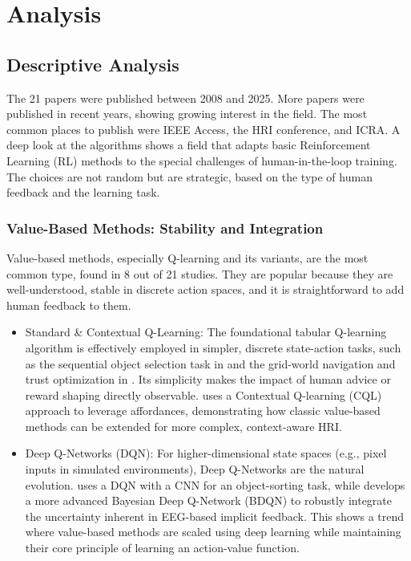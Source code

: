 \documentclass[rnd]{mas_proposal}
\begin{document}
\section{Analysis}
\label{sec:analysis}

\subsection{Descriptive Analysis}
The 21 papers were published between 2008 and 2025. More papers were published in recent years, showing growing interest in the field. The most common places to publish were IEEE Access, the HRI conference, and ICRA.
A deep look at the algorithms shows a field that adapts basic Reinforcement Learning (RL) methods to the special challenges of human-in-the-loop training. The choices are not random but are strategic, based on the type of human feedback and the learning task.


\subsubsection{Value-Based Methods: Stability and Integration}
Value-based methods, especially Q-learning and its variants, are the most common type, found in 8 out of 21 studies. They are popular because they are well-understood, stable in discrete action spaces, and it is straightforward to add human feedback to them.
\begin{itemize}
    \item Standard \& Contextual Q-Learning: The foundational tabular Q-learning algorithm is effectively employed in simpler, discrete state-action tasks, such as the sequential object selection task in \citet{9794595} and the grid-world navigation and trust optimization in \citet{Alzahrani2025}. Its simplicity makes the impact of human advice or reward shaping directly observable. \citet{MunguiaGaleano2023} uses a Contextual Q-learning (CQL) approach to leverage affordances, demonstrating how classic value-based methods can be extended for more complex, context-aware HRI.
    \item Deep Q-Networks (DQN): For higher-dimensional state spaces (e.g., pixel inputs in simulated environments), Deep Q-Networks are the natural evolution. \citet{Moreira2020} uses a DQN with a CNN for an object-sorting task, while \citet{Xu2021} develops a more advanced Bayesian Deep Q-Network (BDQN) to robustly integrate the uncertainty inherent in EEG-based implicit feedback. This shows a trend where value-based methods are scaled using deep learning while maintaining their core principle of learning an action-value function.
\end{itemize}
\end{document}
